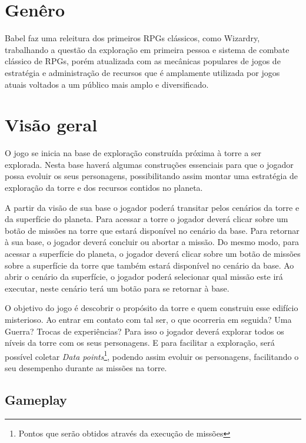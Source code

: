 \documentclass[11pt]{article} %
\begin{document}
\section{Genêro}

Babel faz uma releitura dos primeiros RPGs clássicos, como Wizardry, trabalhando a questão da exploração em primeira pessoa e sistema de combate clássico de RPGs, porém atualizada com as mecânicas populares de jogos de estratégia e administração de recursos que é amplamente utilizada por jogos atuais voltados a um público mais amplo e diversificado.
 
\section{Visão geral}

O jogo se inicia na base de exploração construída próxima à torre a ser explorada. Nesta base haverá algumas construções essenciais para que o jogador possa evoluir os seus personagens, possibilitando assim montar uma estratégia de exploração da torre e dos recursos contidos no planeta.

A partir da visão de sua base o jogador poderá transitar pelos cenários da torre e da superfície do planeta. Para acessar a torre o jogador deverá clicar sobre um botão de missões na torre que estará disponível no cenário da base. Para retornar à sua base, o jogador deverá concluir ou abortar a missão. Do mesmo modo, para acessar a superfície do planeta, o jogador deverá clicar sobre um botão de missões sobre a superfície da torre que também estará disponível no cenário da base. Ao abrir o cenário da superfície, o jogador poderá selecionar qual missão este irá executar, neste cenário terá um botão para se retornar à base.

O objetivo do jogo é descobrir o propósito da torre e quem construiu esse edifício misterioso. Ao entrar em contato com tal ser, o que ocorreria em seguida? Uma Guerra? Trocas de experiências? Para isso o jogador deverá explorar todos os níveis da torre com os seus personagens. E para facilitar a exploração, será possível coletar \textit{Data points}\footnote{Pontos que serão obtidos através da execução de missões}, podendo assim evoluir os personagens, facilitando o seu desempenho durante as missões na torre. 


\subsection{Gameplay}
\end{document}
